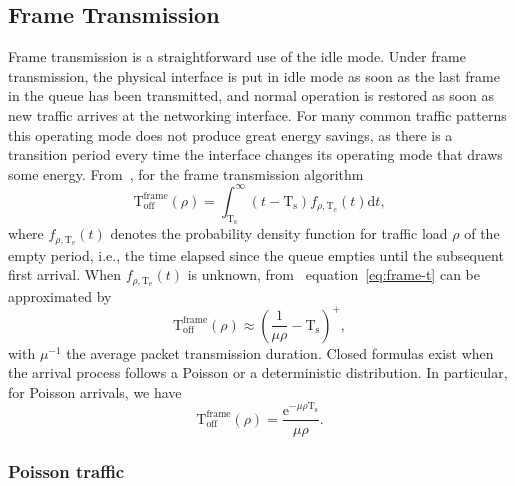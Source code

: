 \documentclass[journal,english,twocolumn,10pt,letterpaper]{IEEEtran}
\newcommand{\added}[1]{{#1}}
\newcommand{\Constantconstant}[2]{\mathrm{#1}_{\mathrm{#2}}}
\newcommand{\Ts}{\Constantconstant T s}
\newcommand{\Te}{\Constantconstant T e}
\newcommand{\Toff}{\mathrm{T}_{\mathrm{off}}}
\begin{document}
\subsection{Frame Transmission}

Frame transmission is a straightforward use of the idle mode. Under frame
transmission, the physical interface is put in idle mode as soon as the last
frame in the queue has been transmitted, and normal operation is restored as
soon as new traffic arrives at the networking interface. For many common
traffic patterns this operating mode does not produce great energy savings, as
there is a transition period every time the interface changes its operating
mode that draws some energy.
From~\cite{herreria12:_gi_g_model_gb_energ_effic_ether}, for the frame
transmission algorithm
\begin{equation}
  \label{eq:frame-t}
  \Toff^{\text{frame}}(\rho) = \int_{\Ts}^\infty (t - \Ts)
  f_{\rho,\Te}(t) \textrm{d}t,
\end{equation}
where $f_{\rho,\Te}(t)$ denotes the probability density function for traffic
load $\rho$ of the empty period, i.e., the time elapsed since the queue
empties until the subsequent first arrival. When $f_{\rho,\Te}(t)$ is unknown,
\added{from~\cite{herreria12:_gi_g_model_gb_energ_effic_ether}}
equation~\eqref{eq:frame-t} can be approximated by
\begin{equation}
  \label{eq:frame-t-approx}
   \Toff^{\text{frame}}(\rho) \approx \left( \frac{1}{\mu \rho} -
     \Ts \right)^+,
\end{equation}
with $\mu^{-1}$ the average packet transmission duration. Closed formulas
exist when the arrival process follows a Poisson or a deterministic
distribution. In particular, for Poisson arrivals, we have
\begin{equation}
  \Toff^{\text{frame}}(\rho) = \frac{\textrm{e}^{-\mu \rho
      \Ts}}{\mu \rho}.
\end{equation}

\subsubsection{Poisson traffic}
\label{sec:poisson-traffic}
\end{document}
